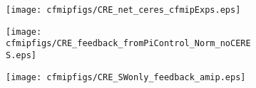 \documentclass[varwidth, border=10pt]{standalone}
\begin{document}

\begin{figure}
  \centering
  \begin{subfigure}{0.31\textwidth}
  \centering
  \texttt{[image: cfmipfigs/CRE\_net\_ceres\_cfmipExps.eps]}
\end{subfigure}

\begin{subfigure}{0.31\textwidth}
\centering
  \texttt{[image: cfmipfigs/CRE\_feedback\_fromPiControl\_Norm\_noCERES.eps]}
\end{subfigure}

\begin{subfigure}{0.31\textwidth}
\centering
  \texttt{[image: cfmipfigs/CRE\_SWonly\_feedback\_amip.eps]}
\end{subfigure}
\end{figure}
\end{document}
